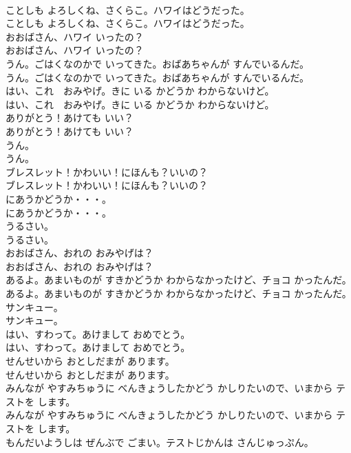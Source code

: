 \documentclass[8pt]{extreport}
\begin{document}
\begin{CJK}{UTF8}{min}
\\	ことしも よろしくね、さくらこ。ハワイはどうだった。
\\	ことしも よろしくね、さくらこ。ハワイはどうだった。
\\	おおばさん、ハワイ いったの？
\\	おおばさん、ハワイ いったの？
\\	うん。ごはくなのかで いってきた。おばあちゃんが すんでいるんだ。
\\	うん。ごはくなのかで いってきた。おばあちゃんが すんでいるんだ。
\\	はい、これ　おみやげ。きに いる かどうか わからないけど。
\\	はい、これ　おみやげ。きに いる かどうか わからないけど。
\\	ありがとう！あけても いい？
\\	ありがとう！あけても いい？
\\	うん。
\\	うん。
\\	ブレスレット！かわいい！にほんも？いいの？
\\	ブレスレット！かわいい！にほんも？いいの？
\\	にあうかどうか・・・。
\\	にあうかどうか・・・。
\\	うるさい。
\\	うるさい。
\\	おおばさん、おれの おみやげは？
\\	おおばさん、おれの おみやげは？
\\	あるよ。あまいものが すきかどうか わからなかったけど、チョコ かったんだ。
\\	あるよ。あまいものが すきかどうか わからなかったけど、チョコ かったんだ。
\\	サンキュー。
\\	サンキュー。
\\	はい、すわって。あけまして おめでとう。
\\	はい、すわって。あけまして おめでとう。
\\	せんせいから おとしだまが あります。
\\	せんせいから おとしだまが あります。
\\	みんなが やすみちゅうに べんきょうしたかどう かしりたいので、いまから テストを します。
\\	みんなが やすみちゅうに べんきょうしたかどう かしりたいので、いまから テストを します。
\\	もんだいようしは ぜんぶで ごまい。テストじかんは さんじゅっぷん。

\end{CJK}
\end{document}
